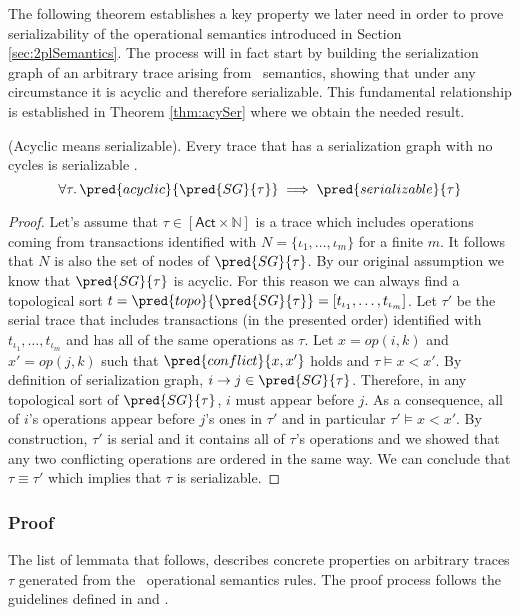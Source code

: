 The following theorem establishes a key property we later need in order to prove serializability of the operational semantics introduced in Section \ref{sec:2plSemantics}. The process will in fact start by building the serialization graph of an arbitrary trace arising from \tpl\ semantics, showing that under any circumstance it is acyclic and therefore serializable. This fundamental relationship is established in Theorem \ref{thm:acySer} where we obtain the needed result.
\begin{thm}
	\label{thm:acySer}
	(Acyclic means serializable).
	Every trace that has a serialization graph with no cycles is serializable \cite{ccontrol}.
	\[
		\forall \tau \ldotp \pred{acyclic}{\pred{SG}{\tau}} \implies \pred{serializable}{\tau}
	\]
	
	\begin{proof}
	Let's assume that $\tau \in [\mathsf{Act} \times \mathds{N}]$ is a trace which includes operations coming from transactions identified with $N = \{ \iota_1, \ldots, \iota_m \}$ for a finite $m$. It follows that $N$ is also the set of nodes of $\pred{SG}{\tau}$. By our original assumption we know that $\pred{SG}{\tau}$ is acyclic. For this reason we can always find a topological sort $t = \pred{topo}{\pred{SG}{\tau}} = [t_{\iota_1}, \ldots, t_{\iota_m}]$. Let $\tau'$ be the serial trace that includes transactions (in the presented order) identified with $t_{\iota_1}, \ldots, t_{\iota_m}$ and has all of the same operations as $\tau$. Let $x = op(i, k)$ and $x' = op(j, k)$ such that $\pred{conflict}{x, x'}$ holds and $\tau \vDash x < x'$. By definition of serialization graph, $i \rightarrow j \in \pred{SG}{\tau}$. Therefore, in any topological sort of $\pred{SG}{\tau}$, $i$ must appear before $j$. As a consequence, all of $i$'s operations appear before $j$'s ones in $\tau'$ and in particular $\tau' \vDash x < x'$. By construction, $\tau'$ is serial and it contains all of $\tau$'s operations and we showed that any two conflicting operations are ordered in the same way. We can conclude that $\tau \equiv \tau'$ which implies that $\tau$ is serializable.
	\end{proof}
\end{thm}

\subsubsection{Proof}

The list of lemmata that follows, describes concrete properties on arbitrary traces $\tau$ generated from the \tpl\ operational semantics rules. The proof process follows the guidelines defined in \cite{papa} and \cite{ccontrol}.

